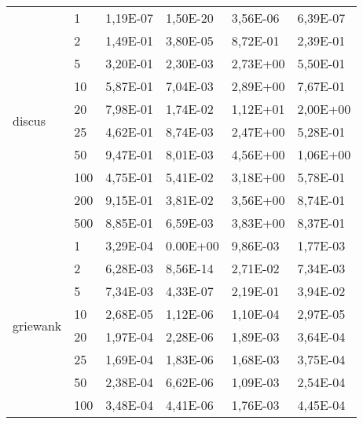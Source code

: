 \begin{longtable}[c]{|p{3.5cm}|l|l|l|l|l|}
\multirow[t]{10}{*}{discus}               & 1         & 1,19E-07 & 1,50E-20 & 3,56E-06 & 6,39E-07 \\ \cline{2-6} 
                                       & 2         & 1,49E-01 & 3,80E-05 & 8,72E-01 & 2,39E-01 \\ \cline{2-6} 
                                       & 5         & 3,20E-01 & 2,30E-03 & 2,73E+00 & 5,50E-01 \\ \cline{2-6} 
                                       & 10        & 5,87E-01 & 7,04E-03 & 2,89E+00 & 7,67E-01 \\ \cline{2-6} 
                                       & 20        & 7,98E-01 & 1,74E-02 & 1,12E+01 & 2,00E+00 \\ \cline{2-6} 
                                       & 25        & 4,62E-01 & 8,74E-03 & 2,47E+00 & 5,28E-01 \\ \cline{2-6} 
                                       & 50        & 9,47E-01 & 8,01E-03 & 4,56E+00 & 1,06E+00 \\ \cline{2-6} 
                                       & 100       & 4,75E-01 & 5,41E-02 & 3,18E+00 & 5,78E-01 \\ \cline{2-6} 
                                       & 200       & 9,15E-01 & 3,81E-02 & 3,56E+00 & 8,74E-01 \\ \cline{2-6} 
                                       & 500       & 8,85E-01 & 6,59E-03 & 3,83E+00 & 8,37E-01 \\ \hline
\multirow[t]{10}{*}{griewank}             & 1         & 3,29E-04 & 0.00E+00 & 9,86E-03 & 1,77E-03 \\ \cline{2-6} 
                                       & 2         & 6,28E-03 & 8,56E-14 & 2,71E-02 & 7,34E-03 \\ \cline{2-6} 
                                       & 5         & 7,34E-03 & 4,33E-07 & 2,19E-01 & 3,94E-02 \\ \cline{2-6} 
                                       & 10        & 2,68E-05 & 1,12E-06 & 1,10E-04 & 2,97E-05 \\ \cline{2-6} 
                                       & 20        & 1,97E-04 & 2,28E-06 & 1,89E-03 & 3,64E-04 \\ \cline{2-6} 
                                       & 25        & 1,69E-04 & 1,83E-06 & 1,68E-03 & 3,75E-04 \\ \cline{2-6} 
                                       & 50        & 2,38E-04 & 6,62E-06 & 1,09E-03 & 2,54E-04 \\ \cline{2-6} 
                                       & 100       & 3,48E-04 & 4,41E-06 & 1,76E-03 & 4,45E-04 \\ \cline{2-6} 

\end{longtable}
